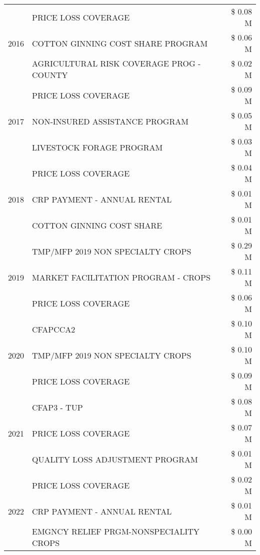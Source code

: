\begin{tabular}{llr}
\cline{1-3}
\multirow[t]{3}{*}{2016} & PRICE LOSS COVERAGE & \$ 0.08 M \\
 & COTTON GINNING COST SHARE PROGRAM & \$ 0.06 M \\
 & AGRICULTURAL RISK COVERAGE PROG - COUNTY & \$ 0.02 M \\
\cline{1-3}
\multirow[t]{3}{*}{2017} & PRICE LOSS COVERAGE & \$ 0.09 M \\
 & NON-INSURED ASSISTANCE PROGRAM & \$ 0.05 M \\
 & LIVESTOCK FORAGE PROGRAM & \$ 0.03 M \\
\cline{1-3}
\multirow[t]{3}{*}{2018} & PRICE LOSS COVERAGE & \$ 0.04 M \\
 & CRP PAYMENT - ANNUAL RENTAL & \$ 0.01 M \\
 & COTTON GINNING COST SHARE & \$ 0.01 M \\
\cline{1-3}
\multirow[t]{3}{*}{2019} & TMP/MFP 2019 NON SPECIALTY CROPS & \$ 0.29 M \\
 & MARKET FACILITATION PROGRAM - CROPS & \$ 0.11 M \\
 & PRICE LOSS COVERAGE & \$ 0.06 M \\
\cline{1-3}
\multirow[t]{3}{*}{2020} & CFAPCCA2 & \$ 0.10 M \\
 & TMP/MFP 2019 NON SPECIALTY CROPS & \$ 0.10 M \\
 & PRICE LOSS COVERAGE & \$ 0.09 M \\
\cline{1-3}
\multirow[t]{3}{*}{2021} & CFAP3 - TUP & \$ 0.08 M \\
 & PRICE LOSS COVERAGE & \$ 0.07 M \\
 & QUALITY LOSS ADJUSTMENT PROGRAM & \$ 0.01 M \\
\cline{1-3}
\multirow[t]{3}{*}{2022} & PRICE LOSS COVERAGE & \$ 0.02 M \\
 & CRP PAYMENT - ANNUAL RENTAL & \$ 0.01 M \\
 & EMGNCY RELIEF PRGM-NONSPECIALITY CROPS & \$ 0.00 M \\
\cline{1-3}
\bottomrule
\end{tabular}
